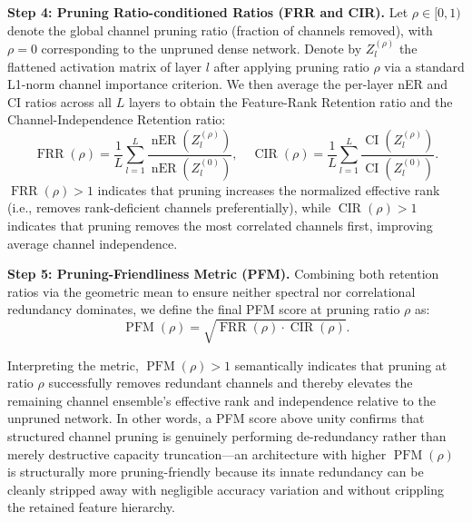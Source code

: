 ﻿\documentclass[conference]{IEEEtran}
\begin{document}
\textbf{Step 4: Pruning Ratio-conditioned Ratios (FRR and CIR).} Let $\rho \in [0, 1)$ denote the global channel pruning ratio (fraction of channels removed), with $\rho = 0$ corresponding to the unpruned dense network. Denote by $Z_l^{(\rho)}$ the flattened activation matrix of layer $l$ after applying pruning ratio $\rho$ via a standard L1-norm channel importance criterion. We then average the per-layer nER and CI ratios across all $L$ layers to obtain the Feature-Rank Retention ratio and the Channel-Independence Retention ratio:
\begin{equation}
\operatorname{FRR}(\rho) = \frac{1}{L} \sum_{l=1}^{L} \frac{\operatorname{nER}(Z_l^{(\rho)})}{\operatorname{nER}(Z_l^{(0)})}, \quad
\operatorname{CIR}(\rho) = \frac{1}{L} \sum_{l=1}^{L} \frac{\operatorname{CI}(Z_l^{(\rho)})}{\operatorname{CI}(Z_l^{(0)})}.
\end{equation}
$\operatorname{FRR}(\rho) > 1$ indicates that pruning increases the normalized effective rank (i.e., removes rank-deficient channels preferentially), while $\operatorname{CIR}(\rho) > 1$ indicates that pruning removes the most correlated channels first, improving average channel independence.

\textbf{Step 5: Pruning-Friendliness Metric (PFM).} Combining both retention ratios via the geometric mean to ensure neither spectral nor correlational redundancy dominates, we define the final PFM score at pruning ratio $\rho$ as:
\begin{equation}
\operatorname{PFM}(\rho) = \sqrt{\operatorname{FRR}(\rho) \cdot \operatorname{CIR}(\rho)}.
\end{equation}

Interpreting the metric, $\operatorname{PFM}(\rho) > 1$ semantically indicates that pruning at ratio $\rho$ successfully removes redundant channels and thereby elevates the remaining channel ensemble's effective rank and independence relative to the unpruned network. In other words, a PFM score above unity confirms that structured channel pruning is genuinely performing de-redundancy rather than merely destructive capacity truncation—an architecture with higher $\operatorname{PFM}(\rho)$ is structurally more pruning-friendly because its innate redundancy can be cleanly stripped away with negligible accuracy variation and without crippling the retained feature hierarchy.
\end{document}
